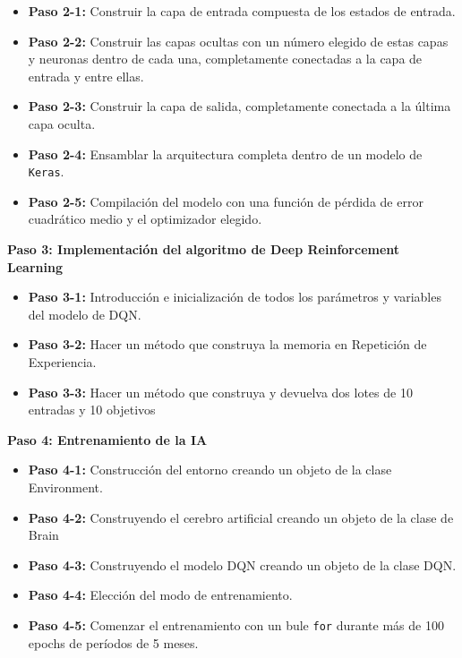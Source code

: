 \documentclass[]{book}
\providecommand{\tightlist}{%
  \setlength{\itemsep}{0pt}\setlength{\parskip}{0pt}}
\begin{document}
\begin{itemize}
\tightlist
\item
  \textbf{Paso 2-1:} Construir la capa de entrada compuesta de los estados de entrada.
\item
  \textbf{Paso 2-2:} Construir las capas ocultas con un número elegido de estas capas y neuronas dentro de cada una, completamente conectadas a la capa de entrada y entre ellas.
\item
  \textbf{Paso 2-3:} Construir la capa de salida, completamente conectada a la última capa oculta.
\item
  \textbf{Paso 2-4:} Ensamblar la arquitectura completa dentro de un modelo de \texttt{Keras}.
\item
  \textbf{Paso 2-5:} Compilación del modelo con una función de pérdida de error cuadrático medio y el optimizador elegido.
\end{itemize}

\textbf{Paso 3: Implementación del algoritmo de Deep Reinforcement Learning}

\begin{itemize}
\tightlist
\item
  \textbf{Paso 3-1:} Introducción e inicialización de todos los parámetros y variables del modelo de DQN.
\item
  \textbf{Paso 3-2:} Hacer un método que construya la memoria en Repetición de Experiencia.
\item
  \textbf{Paso 3-3:} Hacer un método que construya y devuelva dos lotes de 10 entradas y 10 objetivos
\end{itemize}

\textbf{Paso 4: Entrenamiento de la IA}

\begin{itemize}
\tightlist
\item
  \textbf{Paso 4-1:} Construcción del entorno creando un objeto de la clase Environment.
\item
  \textbf{Paso 4-2:} Construyendo el cerebro artificial creando un objeto de la clase de Brain
\item
  \textbf{Paso 4-3:} Construyendo el modelo DQN creando un objeto de la clase DQN.
\item
  \textbf{Paso 4-4:} Elección del modo de entrenamiento.
\item
  \textbf{Paso 4-5:} Comenzar el entrenamiento con un bule \texttt{for} durante más de 100 epochs de períodos de 5 meses.
\end{itemize}
\end{document}
